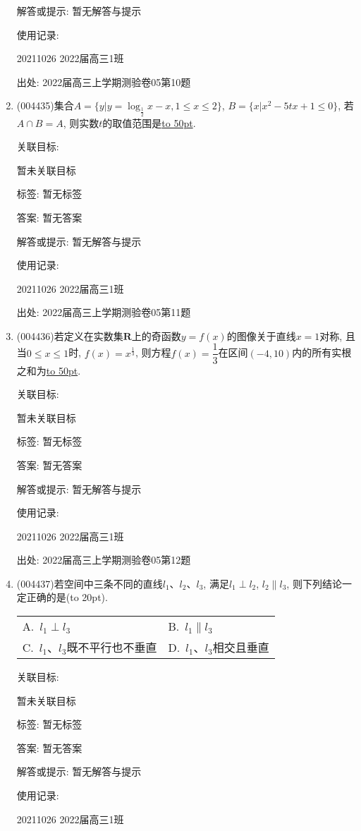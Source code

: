\documentclass[10pt,a4paper]{article}
\newcommand{\blank}[1]{\underline{\hbox to #1pt{}}}
\newcommand{\bracket}[1]{(\hbox to #1pt{})}
\newcommand{\twoch}[4]{\par\begin{tabular}{p{.46\textwidth}p{.46\textwidth}}
A.~#1& B.~#2\\
C.~#3& D.~#4
\end{tabular}}
\begin{document}
\begin{enumerate}[1.]
解答或提示: 暂无解答与提示

使用记录:

20211026	2022届高三1班	


出处: 2022届高三上学期测验卷05第10题
\item { (004435)}集合$A=\{y|y=\log_{\frac 12}x-x,1\le x\le 2\}$, $B=\{x|x^2-5tx+1\le 0\}$, 若$A\cap B=A$, 则实数$t$的取值范围是\blank{50}.


关联目标:

暂未关联目标



标签: 暂无标签

答案: 暂无答案

解答或提示: 暂无解答与提示

使用记录:

20211026	2022届高三1班	


出处: 2022届高三上学期测验卷05第11题
\item { (004436)}若定义在实数集$\mathbf{R}$上的奇函数$y=f(x)$的图像关于直线$x=1$对称, 且当$0\le x\le 1$时, $f(x)=x^{\frac 13}$, 则方程$f(x)=\dfrac 13$在区间$(-4,10)$内的所有实根之和为\blank{50}.


关联目标:

暂未关联目标



标签: 暂无标签

答案: 暂无答案

解答或提示: 暂无解答与提示

使用记录:

20211026	2022届高三1班	


出处: 2022届高三上学期测验卷05第12题
\item { (004437)}若空间中三条不同的直线$l_1$、$l_2$、$l_3$, 满足$l_1\perp l_2$, $l_2\parallel l_3$, 则下列结论一定正确的是\bracket{20}.
\twoch{$l_1\perp l_3$}{$l_1\parallel l_3$}{$l_1$、$l_3$既不平行也不垂直}{$l_1$、$l_3$相交且垂直}


关联目标:

暂未关联目标



标签: 暂无标签

答案: 暂无答案

解答或提示: 暂无解答与提示

使用记录:

20211026	2022届高三1班	



\end{enumerate}
\end{document}
